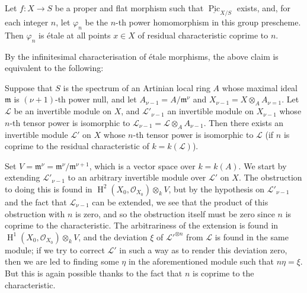\begin{theorem}\label{fga3.vi-2-theorem-2.5}
    Let $f\colon X\to S$ be a proper and flat morphism such that $\underline{\operatorname{Pic}}_{X/S}$ exists, and, for each integer $n$, let $\varphi_n$ be the $n$-th power homomorphism in this group prescheme.
    Then $\varphi_n$ is étale at all points $x\in X$ of residual characteristic coprime to $n$.
\end{theorem}


By the infinitesimal characterisation of étale morphisms, the above claim is equivalent to the following:


\begin{lemma}\label{fga3.vi-2-lemma-2.6}
    Suppose that $S$ is the spectrum of an Artinian local ring $A$ whose maximal ideal $\mathfrak{m}$ is $(\nu+1)$-th power null, and let $A_{\nu-1}=A/\mathfrak{m}^\nu$ and $X_{\nu-1}=X\otimes_A A_{\nu=1}$.
    Let $\mathcal{L}$ be an invertible module on $X$, and $\mathcal{L}'_{\nu-1}$ an invertible module on $X_{\nu-1}$ whose $n$-th tensor power is isomorphic to $\mathcal{L}_{\nu-1}=\mathcal{L}\otimes_A A_{\nu-1}$.
    Then there exists an invertible module $\mathcal{L}'$ on $X$ whose $n$-th tensor power is isomorphic to $\mathcal{L}$ (if $n$ is coprime to the residual characteristic of $k=k(\mathcal{L})$).
\end{lemma}

\begin{cproof}
    Set $V=\mathfrak{m}^\nu=\mathfrak{m}^{\nu}/\mathfrak{m}^{\nu+1}$, which is a vector space over $k=k(A)$.
    We start by extending $\mathcal{L}'_{\nu-1}$ to an arbitrary invertible module over $\mathcal{L}'$ on $X$.
    The obstruction to doing this is found in $\operatorname{H}^2(X_0,\mathcal{O}_{X_0})\otimes_k V$, but by the hypothesis on $\mathcal{L}'_{\nu-1}$ and the fact that $\mathcal{L}_{\nu-1}$ can be extended, we see that the product of this obstruction with $n$ is zero, and so the obstruction itself must be zero since $n$ is coprime to the characteristic.
    The arbitrariness of the extension is found in $\operatorname{H}^1(X_0,\mathcal{O}_{X_0})\otimes_k V$, and the deviation $\xi$ of ${\mathcal{L}'}^{\otimes n}$ from $\mathcal{L}$ is found in the same module;
    if we try to correct $\mathcal{L}'$ in such a way as to render this deviation zero, then we are led to finding some $\eta$ in the aforementioned module such that $n\eta=\xi$.
    But this is again possible thanks to the fact that $n$ is coprime to the characteristic.
\end{cproof}

